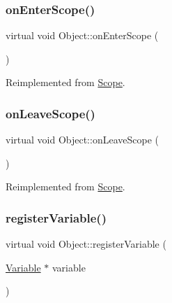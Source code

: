 \mbox{\label{classObject_a61b4cd86dd434abf07e3f4d19b5c93eb}} 
\subsubsection{\texorpdfstring{on\+Enter\+Scope()}{onEnterScope()}}
{\footnotesize\ttfamily virtual void Object\+::on\+Enter\+Scope (\begin{DoxyParamCaption}{ }\end{DoxyParamCaption})\hspace{0.3cm}{\ttfamily [virtual]}}



Reimplemented from \hyperlink{classScope_a4a42aaa7bd341ef07a90ef51860f0a8a}{Scope}.

\mbox{\label{classObject_a54a99563b5936626d47fb1e2f0e13a9c}} 
\subsubsection{\texorpdfstring{on\+Leave\+Scope()}{onLeaveScope()}}
{\footnotesize\ttfamily virtual void Object\+::on\+Leave\+Scope (\begin{DoxyParamCaption}{ }\end{DoxyParamCaption})\hspace{0.3cm}{\ttfamily [virtual]}}



Reimplemented from \hyperlink{classScope_acff92230877eb8ff60f27c86ac56e929}{Scope}.

\mbox{\label{classObject_ad8f3631de109f50f94432ae9e1f7a130}} 
\subsubsection{\texorpdfstring{register\+Variable()}{registerVariable()}}
{\footnotesize\ttfamily virtual void Object\+::register\+Variable (\begin{DoxyParamCaption}\item[{\hyperlink{classVariable}{Variable} $\ast$}]{variable }\end{DoxyParamCaption})\hspace{0.3cm}{\ttfamily [virtual]}}



